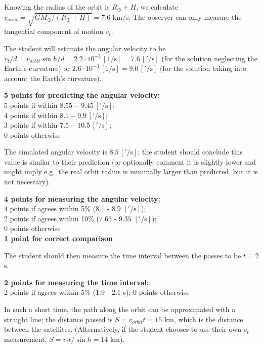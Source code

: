 Knowing the radius of the orbit is $R_\oplus + H$, we calculate
$v_{orbit} = \sqrt{GM_\oplus/(R_\oplus + H)} = 7.6$ km/s. The observer can
only measure the tangential component of motion $v_t$.

The student will estimate the angular velocity to be
$v_t/d = v_{orbit}\sin h/d = 2.2\cdot 10^{-3}\,[1/\mathrm{s}] = 7.6\,['/\mathrm{s}]$
(for the solution neglecting the Earth's curvature) or
$2.6\cdot 10^{-3}\,[1/\mathrm{s}] = 9.0\,['/\mathrm{s}]$ (for the solution
taking into account the Earth's curvature).

\begin{flushright}
\textbf{5 points for predicting the angular velocity:}\\
5 points if within $8.55 - 9.45\,['/\mathrm{s}]$;\\
4 points if within $8.1 - 9.9\,['/\mathrm{s}]$;\\
3 points if within $7.5 - 10.5\,['/\mathrm{s}]$;\\
0 points otherwise
\end{flushright}

The simulated angular velocity is $8.5\,['/\mathrm{s}]$; the student should
conclude this value is similar to their prediction (or optionally comment it
is slightly lower and might imply e.g.\ the real orbit radius is minimally
larger than predicted, but it is not necessary).

\begin{flushright}
\textbf{4 points for measuring the angular velocity:}\\
4 points if agrees within 5\% ($8.1$ - $8.9$ $['/\mathrm{s}]$);\\
2 points if agrees within 10\% ($7.65$ - $9.35$ $['/\mathrm{s}]$);\\
0 points otherwise\\[4pt]
\textbf{1 point for correct comparison}
\end{flushright}

The student should then measure the time interval between the passes to be
$t = 2$ s.

\begin{flushright}
\textbf{2 points for measuring the time interval:}\\
2 points if agrees within 5\% ($1.9$ - $2.1$ s); 0 points otherwise
\end{flushright}

In such a short time, the path along the orbit can be approximated with a
straight line; the distance passed is $S = v_{orbit}t = 15$ km, which is the
distance between the satellites. (Alternatively, if the student chooses to
use their own $v_t$ measurement, $S = v_t t/\sin h = 14$ km).

